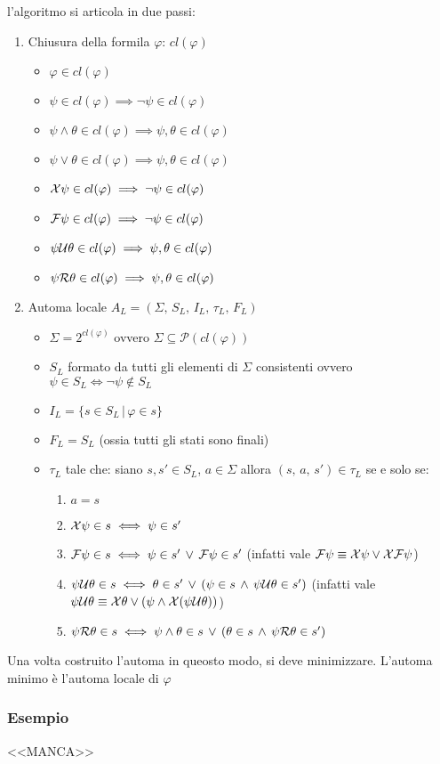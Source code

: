 l'algoritmo si articola in due passi:
\begin{enumerate}
\item Chiusura della formila $\varphi$: $cl(\varphi)$

\begin{itemize}
\item $\varphi\in cl(\varphi)$
\item $\psi\in cl(\varphi)\implies\neg\psi\in cl(\varphi)$
\item $\psi\wedge\theta\in cl(\varphi)\implies\psi,\theta\in cl(\varphi)$
\item $\psi\vee\theta\in cl(\varphi)\implies\psi,\theta\in cl(\varphi)$
\item $\mathcal{X}\psi\in cl(\varphi)\implies\neg\psi\in cl(\varphi)$
\item $\mathcal{F}\psi\in cl(\varphi)\implies\neg\psi\in cl(\varphi)$
\item $\psi\mathcal{U}\theta\in cl(\varphi)\implies\psi,\theta\in cl(\varphi)$
\item $\psi\mathcal{R}\theta\in cl(\varphi)\implies\psi,\theta\in cl(\varphi)$
\end{itemize}
\item Automa locale $A_{L}=(\Sigma,\, S_{L},\, I_{L},\,\tau_{L},\, F_{L})$

\begin{itemize}
\item $\Sigma=2^{cl(\varphi)}$ ovvero $\Sigma\subseteq\mathcal{P}(cl(\varphi))$
\item $S_{L}$ formato da tutti gli elementi di $\Sigma$ consistenti ovvero
$\psi\in S_{L}\iff\neg\psi\notin S_{L}$
\item $I_{L}=\{s\in S_{L}\,|\,\varphi\in s\}$
\item $F_{L}=S_{L}$ (ossia tutti gli stati sono finali)
\item $\tau_{L}$ tale che: siano $s,s'\in S_{L}$, $a\in\Sigma$ allora
$(s,\, a,\, s')\in\tau_{L}$ se e solo se:

\begin{enumerate}
\item $a=s$
\item $\mathcal{X}\psi\in s\iff\psi\in s'$
\item $\mathcal{F}\psi\in s\iff\psi\in s'\,\vee\,\mathcal{F}\psi\in s'$
(infatti vale $\mathcal{F}\psi\equiv\mathcal{X}\psi\vee\mathcal{X}\mathcal{F}\psi$)
\item $\psi\mathcal{U}\theta\in s\iff\theta\in s'\,\vee\,(\psi\in s\,\wedge\,\psi\mathcal{U}\theta\in s')$
(infatti vale $\psi\mathcal{U}\theta\equiv\mathcal{X}\theta\vee(\psi\wedge\mathcal{X}(\psi\mathcal{U}\theta))$)
\item $\psi\mathcal{R}\theta\in s\iff\psi\wedge\theta\in s\,\vee\,(\theta\in s\,\wedge\,\psi\mathcal{R}\theta\in s')$
\end{enumerate}
\end{itemize}
\end{enumerate}
Una volta costruito l'automa in queosto modo, si deve minimizzare.
L'automa minimo è l'automa locale di $\varphi$


\subsubsection*{Esempio}

<\textcompwordmark{}<MANCA>\textcompwordmark{}>
